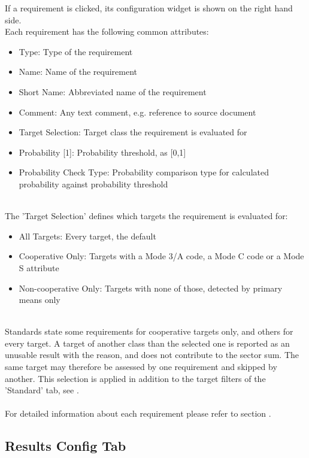 If a requirement is clicked, its configuration widget is shown on the right hand side. \\

Each requirement has the following common attributes:
\begin{itemize}  
\item Type: Type of the requirement
\item Name: Name of the requirement
\item Short Name: Abbreviated name of the requirement
\item Comment: Any text comment, e.g. reference to source document
\item Target Selection: Target class the requirement is evaluated for
\item Probability [1]: Probability threshold, as [0,1]
\item Probability Check Type: Probability comparison type for calculated probability against probability threshold
\end{itemize}
\ \\

The 'Target Selection' defines which targets the requirement is evaluated for:
\begin{itemize}
\item All Targets: Every target, the default
\item Cooperative Only: Targets with a Mode 3/A code, a Mode C code or a Mode S attribute
\item Non-cooperative Only: Targets with none of those, detected by primary means only
\end{itemize}
\ \\

Standards state some requirements for cooperative targets only, and others for every target. A target of another class than the selected one is reported as an unusable result with the reason, and does not contribute to the sector sum. The same target may therefore be assessed by one requirement and skipped by another. This selection is applied in addition to the target filters of the 'Standard' tab, see . \\
\ \\

For detailed information about each requirement please refer to section .

\subsection{Results Config Tab}

